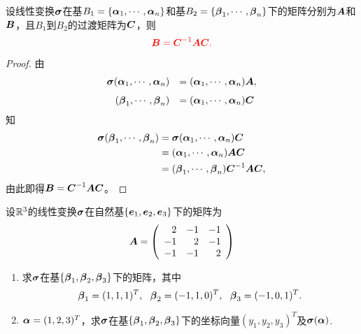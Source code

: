 \begin{frame}
  \begin{dingli}
    设线性变换$\sigmabd$在基$B_1=\{\alphabd_1,\cd,\alphabd_n\}$和基$B_2=\{\betabd_1,\cd,\betabd_n\}$下的矩阵分别为$\MA$和$\MB$，且$B_1$到$B_2$的过渡矩阵为$\MC$，则
    $$
    \red{\MB = \MC^{-1}\MA\MC.}
    $$
  \end{dingli}\vspace{.1in}\pause 
  \begin{proof}
    由
    $$
    \begin{array}{rl}
      \sigmabd(\alphabd_1,\cd,\alphabd_n)&=(\alphabd_1,\cd,\alphabd_n)\MA, \\[.1in]
      (\betabd_1,\cd,\betabd_n)&=(\alphabd_1,\cd,\alphabd_n)\MC
    \end{array}
    $$
    知
    $$
    \begin{aligned}
      \sigmabd(\betabd_1,\cd,\betabd_n)&=\sigmabd(\alphabd_1,\cd,\alphabd_n)\MC\\
      &=(\alphabd_1,\cd,\alphabd_n)\MA\MC\\
      &=(\betabd_1,\cd,\betabd_n)\MC^{-1}\MA\MC,
    \end{aligned}
    $$
    由此即得$\MB=\MC^{-1}\MA\MC$。
  \end{proof}
\end{frame}


\begin{frame}
  \begin{li}
    设$\R^3$的线性变换$\sigmabd$在自然基$\{\ve_1,\ve_2,\ve_3\}$下的矩阵为
    $$
    \MA=\left(
      \begin{array}{rrr}
        2&-1&-1\\
        -1&2&-1\\
        -1&-1&2
      \end{array}
    \right)
    $$
    \begin{enumerate}
    \item 求$\sigmabd$在基$\{\betabd_1,\betabd_2,\betabd_3\}$下的矩阵，其中
      $$
      \betabd_1=(1,1,1)^T, ~~\betabd_2=(-1,1,0)^T, ~~\betabd_3=(-1,0,1)^T.
      $$
    \item $\alphabd=(1,2,3)^T$，求$\sigmabd$在基$\{\betabd_1,\betabd_2,\betabd_3\}$下的坐标向量$(y_1,y_2,y_3)^T$及$\sigmabd(\alphabd)$.
    \end{enumerate}
  \end{li}
\end{frame}


